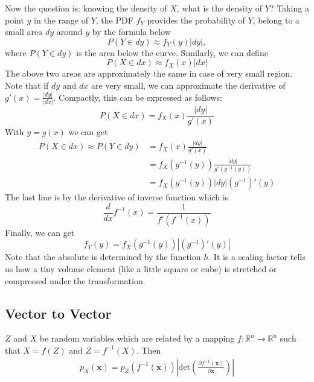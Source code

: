 Now the question is: knowing the density of $X$, what is the density of $Y$?
Taking a point $y$ in the range of $Y$, the PDF $f_Y$ provides the probability of $Y$, belong to a small area $dy$ around $y$ by the formula below
$$P(Y\in dy)\approx f_Y(y)|dy|,$$
where $P(Y\in dy)$ is the area below the curve. Similarly, we can define
$$P(X\in dx)\approx f_X(x)|dx|$$
The above two areas are approximately the same in case of very small region. Note that if $dy$ and $dx$ are very small, we can approximate the derivative of $g'(x)=\frac{|dy|}{|dx|}$. Compactly, this can be expressed as follows:
$$P(X\in dx) = f_X(x)\frac{|dy|}{g'(x)}$$
With $y=g(x)$ we can get 
\begin{align*}
	P(X\in dx)\approx P(Y\in dy) &= f_X(x)\frac{|dy|}{g'(x)}\\
	& = f_X(g^{-1}(y))\frac{|dy|}{g'(g^{-1}(y))}\\
	& = f_X(g^{-1}(y))|dy|(g^{-1})'(y)
\end{align*}
The last line is by the derivative of inverse function which is 
$$\frac{d}{dx}f^{-1}(x) = \frac{1}{f'(f^{-1}(x))}$$
Finally, we can get 
$$f_Y(y) = f_X(g^{-1}(y))|(g^{-1})'(y)|$$
Note that the absolute is determined by the function $h$. It is a scaling factor tells us how a tiny volume element (like a little square or cube) is stretched or compressed under the transformation. 

\subsection{Vector to Vector}

$Z$ and $X$ be random variables which are related by a mapping $f:\mathbb{R}^n\to \mathbb{R}^n$ such that $X=f(Z)$ and $Z=f^{-1}(X)$. Then
\begin{align*}
	p_X(\mathbf{x}) = p_Z(f^{-1}(\mathbf{x})) \left\vert \text{det}\left(\frac{\partial f^{-1}(\mathbf{x})}{\partial \mathbf{x}}\right) \right\vert
\end{align*}

